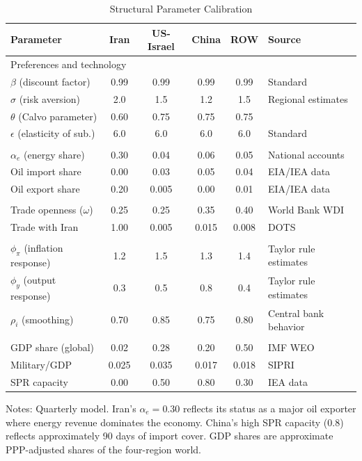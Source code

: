 \documentclass[12pt]{article}
\begin{document}
\begin{table}[H]
\centering
\small
\begin{threeparttable}
\caption{Structural Parameter Calibration}
\label{tab:calibration}
\begin{tabular}{@{}lccccl@{}}
\toprule
Parameter & Iran & US-Israel & China & ROW & Source \\
\midrule
\multicolumn{6}{l}{Preferences and technology} \\
$\beta$ (discount factor) & 0.99 & 0.99 & 0.99 & 0.99 & Standard \\
$\sigma$ (risk aversion) & 2.0 & 1.5 & 1.2 & 1.5 & Regional estimates \\
$\theta$ (Calvo parameter) & 0.60 & 0.75 & 0.75 & 0.75 & \citet{gali2015monetary} \\
$\epsilon$ (elasticity of sub.) & 6.0 & 6.0 & 6.0 & 6.0 & Standard \\
\addlinespace
\multicolumn{6}{l}{Energy sector} \\
$\alpha_e$ (energy share) & 0.30 & 0.04 & 0.06 & 0.05 & National accounts \\
Oil import share & 0.00 & 0.03 & 0.05 & 0.04 & EIA/IEA data \\
Oil export share & 0.20 & 0.005 & 0.00 & 0.01 & EIA/IEA data \\
\addlinespace
\multicolumn{6}{l}{Trade} \\
Trade openness ($\omega$) & 0.25 & 0.25 & 0.35 & 0.40 & World Bank WDI \\
Trade with Iran & 1.00 & 0.005 & 0.015 & 0.008 & DOTS \\
\addlinespace
\multicolumn{6}{l}{Monetary policy} \\
$\phi_\pi$ (inflation response) & 1.2 & 1.5 & 1.3 & 1.4 & Taylor rule estimates \\
$\phi_y$ (output response) & 0.3 & 0.5 & 0.8 & 0.4 & Taylor rule estimates \\
$\rho_i$ (smoothing) & 0.70 & 0.85 & 0.75 & 0.80 & Central bank behavior \\
\addlinespace
\multicolumn{6}{l}{Scale and military} \\
GDP share (global) & 0.02 & 0.28 & 0.20 & 0.50 & IMF WEO \\
Military/GDP & 0.025 & 0.035 & 0.017 & 0.018 & SIPRI \\
SPR capacity & 0.00 & 0.50 & 0.80 & 0.30 & IEA data \\
\bottomrule
\end{tabular}
\begin{tablenotes}[flushleft]
\small
\item Notes: Quarterly model. Iran's $\alpha_e = 0.30$ reflects its status as a major oil exporter where energy revenue dominates the economy. China's high SPR capacity (0.8) reflects approximately 90 days of import cover. GDP shares are approximate PPP-adjusted shares of the four-region world.
\end{tablenotes}
\end{threeparttable}
\end{table}
\end{document}
